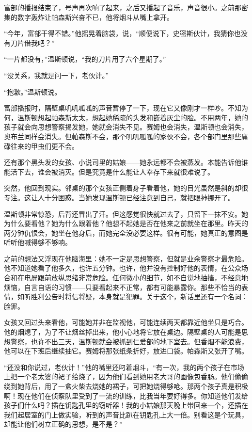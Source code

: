 富部的播报结束了，号声再次响了起来，之后又播起了音乐，声音很小。之前那密集的数字轰炸让帕森斯兴奋不已，他将烟斗从嘴上拿开。

``今年，富部干得不错。''他摇晃着脑袋，说，``顺便说下，史密斯伙计，我猜你也没有刀片借我吧？''

``一片都没有，''温斯顿说，``我的刀片用了六个星期了。''

``没关系，我就是问一下，老伙计。''

``抱歉。''温斯顿说。

富部播报时，隔壁桌叽叽呱呱的声音暂停了一下，现在它又像刚才一样吵。不知为何，温斯顿想起帕森斯太太，想起她稀疏的头发和嵌着灰尘的脸。不用两年，她的孩子就会向思想警察揭发她，她就会消失不见。赛姆也会消失，温斯顿也会消失，奥布兰同样会消失。但帕森斯不会，那个叽叽呱呱的家伙不会，各个部门里那些庸碌往来的甲虫们更不会。

还有那个黑头发的女孩、小说司里的姑娘——她永远都不会被蒸发。本能告诉他谁能活下去，谁会被消灭。但是究竟是什么能让人幸存下来就很难说了。

突然，他回到现实。邻桌的那个女孩正侧着身子看着他，她的目光虽然是斜的却很专注。这让人十分困惑。当她发现温斯顿已经注意到自己，就把眼神挪开了。

温斯顿非常惊恐，后背还冒出了汗。但这感觉很快就过去了，只留下一抹不安。她为什么要看他？她为什么跟着他？他想不起她是否在他来之前就坐在那里。昨天的两分钟仇恨会，她坐在他身后，而她完全没必要这样。很有可能，她真正的意图是听听他喊得够不够响。

之前的想法又浮现在他脑海里：她不一定是思想警察，但就是业余警察才最危险。他不知道她看了他多久，也许五分钟。也许，他并没有控制好他的表情，在公众场合和在电屏跟前放纵思绪非常危险。任何微小的细节，如不自觉地抽搐，不经意地烦恼，自言自语的习惯——只要看起来不正常，都有可能暴露你。那些不恰当的表情，如听胜利公告时将信将疑，本身就是犯罪。关于这个，新话里还有一个名词：脸罪。

女孩又回过头来看他，可能她并非在监视他，可能连续两天都靠近他坐只是巧合。他的烟熄了，为了不让烟丝掉出来，他小心地将它放在桌边。隔壁桌的人可能是思想警察，也许不出三天，温斯顿就会被抓到仁爱部的地下室去。但香烟不能浪费，他可以在下班后继续抽它。赛姆将那张纸条折好，放进口袋。帕森斯又张开了嘴。

``还没和你说过，老伙计！''他的嘴里还叼着烟斗，``有一次，我的两个孩子在市场上把一个老太婆的裙子给烧了，因为他们看到她用老大哥的画像包香肠。他们偷偷绕到她背后，用了一盒火柴去烧她的裙子，可把她烧得够呛。那两个孩子真是积极啊！现在他们在侦察队里受到了一流的训练，比我当年要好得多。你知道他们发给孩子们什么吗？插在钥匙孔里的窃听器！我的小姑娘那天晚上带回来一个，还插在我们起居室的门上做实验，听到的声音比趴在钥匙孔上大一倍。别看这是个玩具，却能让他们树立正确的思想，是不是？''


